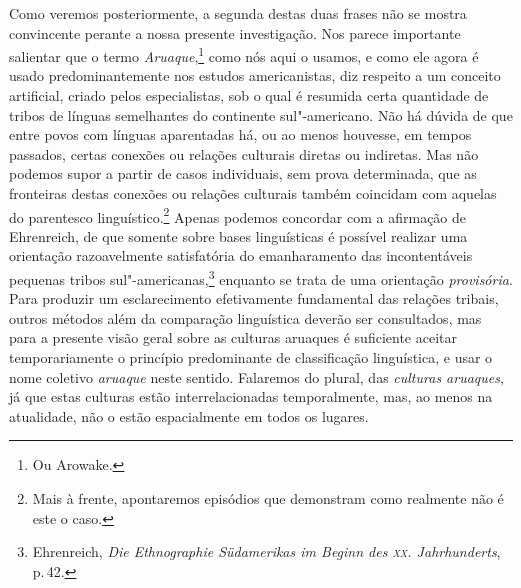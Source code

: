 Como veremos posteriormente, a segunda destas duas frases não se
mostra convincente perante a nossa presente investigação. Nos parece
importante salientar que o termo \textit{Aruaque},\footnote{Ou Arowake.} como nós aqui o usamos, 
e como ele agora é usado predominantemente nos
estudos americanistas, diz respeito a um conceito artificial, criado
pelos especialistas, sob o qual é resumida certa quantidade de tribos
de línguas semelhantes do continente sul"-americano. Não há dúvida de que
entre povos com línguas aparentadas há, ou ao menos houvesse, em tempos
passados, certas conexões ou relações culturais diretas ou indiretas.
Mas não podemos supor a partir de casos individuais, sem prova
determinada, que as fronteiras destas conexões ou relações culturais
também coincidam com aquelas do parentesco linguístico.\footnote{Mais à frente, apontaremos episódios
que demonstram como realmente não é este o caso.} Apenas podemos
concordar com a afirmação de Ehrenreich, de que somente sobre bases
linguísticas é possível realizar uma orientação razoavelmente
satisfatória do emanharamento das incontentáveis pequenas tribos
sul"-americanas,\footnote{Ehrenreich, \textit{Die Ethnographie Südamerikas im
  Beginn des \textsc{xx}. Jahrhunderts}, p.\,42.} enquanto se trata de uma
orientação \textit{provisória}. Para produzir um esclarecimento
efetivamente fundamental das relações tribais, outros métodos além da
comparação linguística deverão ser consultados, mas para a presente
visão geral sobre as culturas aruaques é suficiente aceitar
temporariamente o princípio predominante de classificação linguística, 
e usar o nome coletivo \textit{aruaque} neste
sentido. Falaremos do plural, das \textit{culturas aruaques}, já que estas
culturas estão interrelacionadas temporalmente, mas, ao menos na
atualidade, não o estão espacialmente em todos os lugares.

